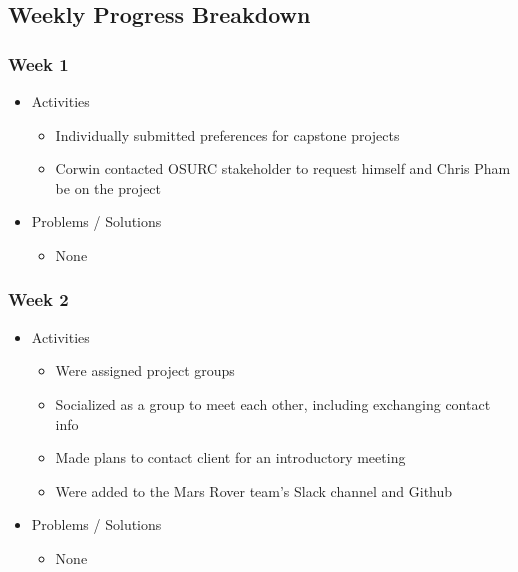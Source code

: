 \subsection{Weekly Progress Breakdown}
\subsubsection{Week 1}
\begin{itemize}
\item Activities
  \begin{itemize}
  \item Individually submitted preferences for capstone projects
  \item Corwin contacted OSURC stakeholder to request himself and Chris Pham be on the project
  \end{itemize}
  
\item Problems / Solutions
  \begin{itemize}
  \item None
  \end{itemize}
\end{itemize}


\subsubsection{Week 2}
\begin{itemize}
\item Activities
  \begin{itemize}
  \item Were assigned project groups
  \item Socialized as a group to meet each other, including exchanging contact info
  \item Made plans to contact client for an introductory meeting
  \item Were added to the Mars Rover team's Slack channel and Github
  \end{itemize}
  
\item Problems / Solutions
  \begin{itemize}
  \item None
  \end{itemize}
\end{itemize}


